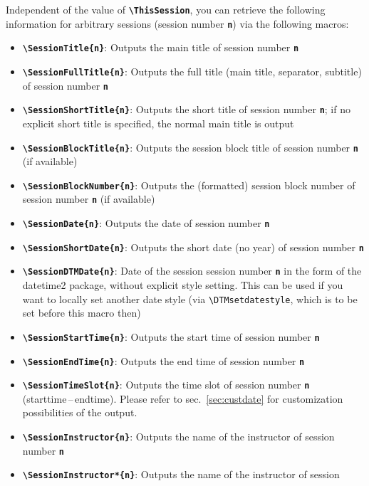 \documentclass[english]{article}
\newcommand*\jmacro[1]{\textbf{\texttt{#1}}}
\newcommand*\jcsmacro[1]{\jmacro{\textbackslash{#1}}}
\newcommand*\joption[1]{\textbf{\texttt{#1}}}
\newcommand*\jfmacro[1]{\texttt{#1}}
\newcommand*\jfcsmacro[1]{\jfmacro{\textbackslash{#1}}}
\newcommand*\jparam[1]{\angus #1\angud}
\begin{document}
Independent of the value of \jcsmacro{ThisSession},
you can retrieve the following information for arbitrary sessions
(session number \joption{\jparam{n}}) via the following macros:
\begin{itemize}
\item \jcsmacro{SessionTitle\{\jparam{n}\}}: Outputs the main title
of session number \joption{\jparam{n}}
\item \jcsmacro{SessionFullTitle\{\jparam{n}\}}: Outputs the full
title (main title, separator, subtitle) of session number \joption{\jparam{n}}
\item \jcsmacro{SessionShortTitle\{\jparam{n}\}}: Outputs the short
title of session number \joption{\jparam{n}}; if
no explicit short title is specified, the normal main title is output
\item \jcsmacro{SessionBlockTitle\{\jparam{n}\}}: Outputs the session block title
of session number \joption{\jparam{n}} (if available)
\item \jcsmacro{SessionBlockNumber\{\jparam{n}\}}: Outputs the (formatted) session block number
of session number \joption{\jparam{n}} (if available)
\item \jcsmacro{SessionDate\{\jparam{n}\}}: Outputs the date of
session number \joption{\jparam{n}}
\item \jcsmacro{SessionShortDate\{\jparam{n}\}}: Outputs the short
date (no year) of session number \joption{\jparam{n}}
\item \jcsmacro{SessionDTMDate\{\jparam{n}\}}: Date of the session session number \joption{\jparam{n}}
in the form of the \textsf{datetime2} package, without explicit style setting.
This can be used if you want to locally set another
date style (via \jfcsmacro{DTMsetdatestyle}, which is to be set before this macro then)
\item \jcsmacro{SessionStartTime\{\jparam{n}\}}: Outputs the start time of
session number \joption{\jparam{n}}
\item \jcsmacro{SessionEndTime\{\jparam{n}\}}: Outputs the end time of
session number \joption{\jparam{n}}
\item \jcsmacro{SessionTimeSlot\{\jparam{n}\}}: Outputs the time slot of
session number \joption{\jparam{n}} (starttime\,--\,endtime). Please refer to
sec.~\ref{sec:custdate} for customization possibilities of the output.
\item \jcsmacro{SessionInstructor\{\jparam{n}\}}: Outputs the name of the instructor of session
number \joption{\jparam{n}}
\item \jcsmacro{SessionInstructor*\{\jparam{n}\}}: Outputs the name of the instructor of session

\end{itemize}
\end{document}
